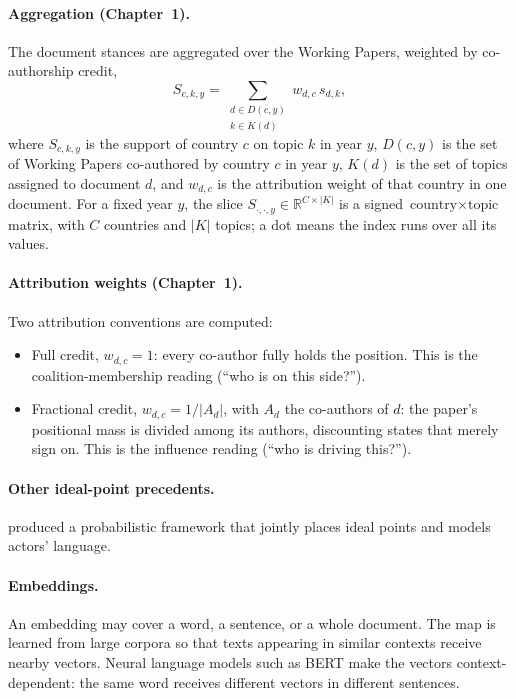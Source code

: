 \paragraph{Aggregation (Chapter~1).}
The document stances are aggregated over the Working Papers, weighted by co-authorship credit,
\begin{equation}
  S_{c,k,y} = \sum_{\substack{d \in D(c,y) \\ k \in K(d)}}
              w_{d,c}\, s_{d,k},
  \label{eq:aggregate}
\end{equation}
where $S_{c,k,y}$ is the support of country $c$ on topic $k$ in year $y$, $D(c,y)$ is the set of
Working Papers co-authored by country $c$ in year $y$, $K(d)$ is the set of topics assigned to
document $d$, and $w_{d,c}$ is the attribution weight of that country in one document. For a
fixed year $y$, the slice $S_{\cdot,\cdot,y} \in \mathbb{R}^{C \times |K|}$ is a signed
$\text{country} \times \text{topic}$ matrix, with $C$ countries and $|K|$ topics; a dot means
the index runs over all its values.

\paragraph{Attribution weights (Chapter~1).}
Two attribution conventions are computed:
\begin{itemize}
      \item Full credit, $w_{d,c} = 1$: every co-author fully holds the position. This is the
      coalition-membership reading (``who is on this side?'').
      \item Fractional credit, $w_{d,c} = 1/|A_d|$, with $A_d$ the co-authors of $d$: the
      paper's positional mass is divided among its authors, discounting states that merely sign
      on. This is the influence reading (``who is driving this?'').
\end{itemize}

\paragraph{Other ideal-point precedents.}
\textcite{Vafa2020} produced a probabilistic framework that jointly places ideal points and
models actors' language.

\paragraph{Embeddings.}
An embedding may cover a word, a sentence, or a whole document. The map is learned from large
corpora so that texts appearing in similar contexts receive nearby vectors. Neural language
models such as BERT \parencite{Devlin2019} make the vectors context-dependent: the same word
receives different vectors in different sentences.

